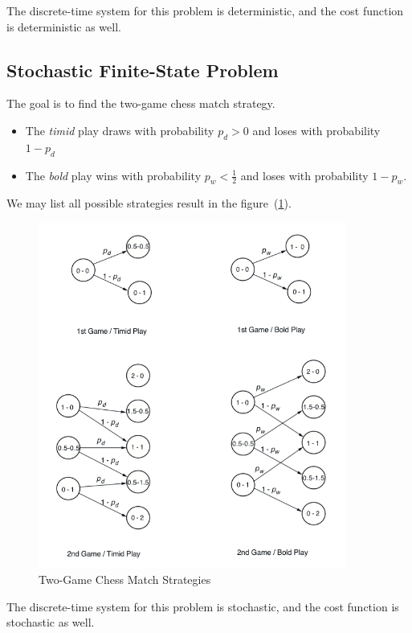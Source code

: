 The discrete-time system for this problem is deterministic, and the cost function is deterministic as well.

\subsection{Stochastic Finite-State Problem}
The goal is to find the two-game chess match strategy. 
\begin{itemize}
\item
The \emph{timid} play draws with probability $p_d>0$ and loses with probability $1-p_d$
\item
The \emph{bold} play wins with probability $p_w<\frac{1}{2}$ and loses with probability $1-p_w$.
\end{itemize}
We may list all possible strategies result in the figure~(\ref{fig:1:3}).
\begin{figure}
\centering
\includegraphics[width = 0.9\textwidth]{First_lecture/p_4}
\caption{Two-Game Chess Match Strategies}
\label{fig:1:3}
\end{figure}
The discrete-time system for this problem is stochastic, and the cost function is stochastic as well.

